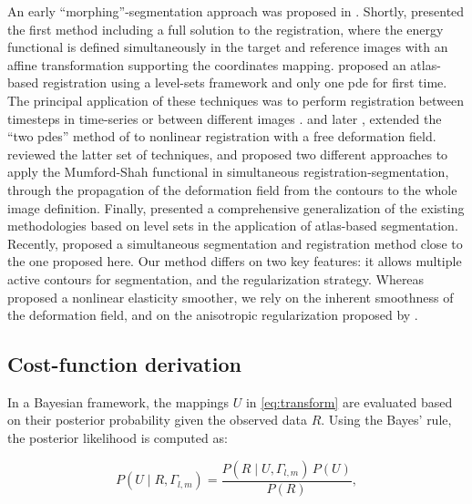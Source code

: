 An early ``morphing''-segmentation approach was proposed in \citep{bertalmio_morphing_2000}.
Shortly, \cite{yezzi_variational_2001} presented the first method including a full solution to
  the registration, where the energy functional is defined simultaneously in the target
  and reference images with an affine transformation supporting the coordinates mapping.
\cite{vemuri_joint_2003} proposed an atlas-based registration using a level-sets
  framework and only one \gls*{pde} for first time.
The principal application of these techniques was to perform registration between timesteps in
  time-series or between different images \citep{paragios_level_2003}.
\cite{unal_coupled_2005} and later \cite{wang_joint_2006},
  extended the ``two \glspl*{pde}'' method of \cite{yezzi_variational_2001}
  to nonlinear registration with a free deformation field.
\cite{droske_mumfordshah_2009} reviewed the latter set of techniques, and proposed two different
  approaches to apply the Mumford-Shah functional \citep{mumford_optimal_1989} in simultaneous
  registration-segmentation, through the propagation of the deformation field from
  the contours to the whole image definition.
Finally, \cite{gorthi_active_2011} presented a comprehensive generalization of the
  existing methodologies based on level sets in the application of atlas-based segmentation.
Recently, \cite{guyader_combined_2011} proposed a simultaneous segmentation and
  registration method close to the one proposed here.
Our method differs on two key features:
  it allows multiple active contours for segmentation, and the regularization strategy.
Whereas \cite{guyader_combined_2011} proposed a nonlinear elasticity smoother, we rely on
  the inherent smoothness of the deformation field, and on the anisotropic regularization
  proposed by \cite{nagel_investigation_1986}.


\subsection*{Cost-function derivation}\label{sec:methods_map}

In a Bayesian framework, the mappings $U$ in \eqref{eq:transform} are
  evaluated based on their posterior probability given the observed data
  $R$.
Using the Bayes' rule, the posterior likelihood is computed as:

  \begin{equation}
  P(U \mid R,\Gamma_{l,m}) = \frac{P(R \mid U,\Gamma_{l,m})\, P(U)}{P(R)},
  \label{eq:bayes_rule}
  \end{equation}

